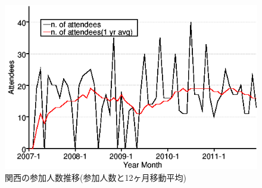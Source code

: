 \documentclass[mingoth,a4paper]{jsarticle}
\begin{document}
\begin{figure}[h]
  \begin{center}
    \includegraphics[width=.8\hsize]{image201112/memberanalysis/kansai.png}
  \end{center}
  \caption{関西の参加人数推移(参加人数と12ヶ月移動平均)}
  \label{fig:kansaipeoplechart}
\end{figure}
\end{document}
